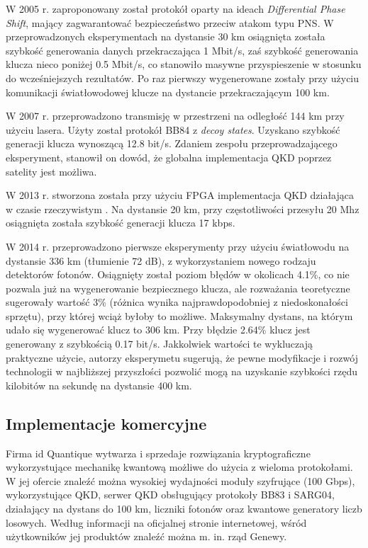 \documentclass[10pt]{article}
\begin{document}
W 2005 r. zaproponowany został protokół oparty na ideach \emph{Differential Phase Shift}, mający
zagwarantować bezpieczeństwo przeciw atakom typu PNS\cite{Takesue05}. W przeprowadzonych eksperymentach
na dystansie 30 km osiągnięta została szybkość generowania danych przekraczająca 1 Mbit/s, zaś szybkość
generowania klucza nieco poniżej 0.5 Mbit/s, co stanowiło masywne przyspieszenie w stosunku do 
wcześniejszych rezultatów. Po raz pierwszy wygenerowane zostały przy użyciu komunikacji światłowodowej
klucze na dystancie przekraczającym 100 km.

W 2007 r. przeprowadzono transmisję w przestrzeni na odległość 144 km przy użyciu lasera. Użyty
został protokół BB84 z \emph{decoy states}. Uzyskano szybkość generacji klucza wynoszącą 12.8 bit/s.
Zdaniem zespołu przeprowadzającego eksperyment, stanowił on dowód, że globalna implementacja QKD
poprzez satelity jest możliwa.

W 2013 r. stworzona została przy użyciu FPGA implementacja QKD działająca w czasie rzeczywistym
\cite{Zhang13}. Na dystansie 20 km, przy częstotliwości przesyłu 20 Mhz osiągnięta została szybkość
generacji klucza 17 kbps.

W 2014 r. przeprowadzono pierwsze eksperymenty przy użyciu światłowodu na dystansie 336 km (tłumienie
72 dB), z wykorzystaniem nowego rodzaju detektorów fotonów\cite{Shibata14}. Osiągnięty został poziom 
błędów w okolicach 4.1\%, co nie pozwala już na wygenerowanie bezpiecznego klucza, ale rozważania
teoretyczne sugerowały wartość 3\% (różnica wynika najprawdopodobniej z niedoskonałości sprzętu), 
przy której wciąż byłoby to możliwe. Maksymalny dystans, na którym udało się wygenerować klucz to 
306 km. Przy błędzie 2.64\% klucz jest generowany z szybkością 0.17 bit/s. Jakkolwiek wartości te 
wykluczają praktyczne użycie, autorzy eksperymetu sugerują, że pewne modyfikacje i rozwój technologii 
w najbliższej przyszłości pozwolić mogą na uzyskanie szybkości rzędu kilobitów na sekundę na dystansie 
400 km.

\subsection{Implementacje komercyjne}

Firma id Quantique\cite{idquantique} wytwarza i sprzedaje rozwiązania kryptograficzne wykorzystujące
mechanikę kwantową możliwe do użycia z wieloma protokołami. W jej ofercie znaleźć można wysokiej
wydajności moduły szyfrujące (100 Gbps), wykorzystujące QKD, serwer QKD obsługujący protokoły BB83
i SARG04, działający na dystans do 100 km, liczniki fotonów oraz kwantowe generatory liczb losowych.
Według informacji na oficjalnej stronie internetowej, wśród użytkowników jej produktów znaleźć można
m. in. rząd Genewy.
\end{document}
